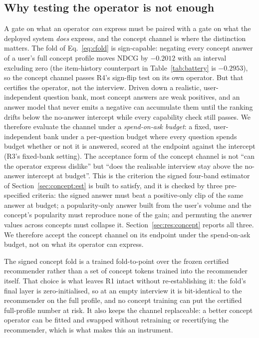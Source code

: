 \documentclass[manuscript,screen,review]{acmart}
\begin{document}
\subsection{Why testing the operator is not enough}\label{sec:concept:deploy}

A gate on what an operator \emph{can} express must be paired with a gate on what the deployed system \emph{does} express, and the concept channel is where the distinction matters. The fold of Eq.~\eqref{eq:cfold} is sign-capable: negating every concept answer of a user's full concept profile moves NDCG by $-0.2012$ with an interval excluding zero (the item-history counterpart in Table~\ref{tab:battery} is $-0.2953$), so the concept channel passes R4's sign-flip test on its own operator. But that certifies the operator, not the interview. Driven down a realistic, user-independent question bank, most concept answers are weak positives, and an answer model that never emits a negative can accumulate them until the ranking drifts below the no-answer intercept while every capability check still passes. We therefore evaluate the channel under a \emph{spend-on-ask budget}: a fixed, user-independent bank under a per-question budget where every question spends budget whether or not it is answered, scored at the endpoint against the intercept (R3's fixed-bank setting). The acceptance form of the concept channel is not ``can the operator express dislike'' but ``does the realisable interview stay above the no-answer intercept at budget''. This is the criterion the signed four-band estimator of Section~\ref{sec:concept:est} is built to satisfy, and it is checked by three pre-specified criteria: the signed answer must beat a positive-only clip of the same answer at budget; a popularity-only answer built from the user's volume and the concept's popularity must reproduce none of the gain; and permuting the answer values across concepts must collapse it. Section~\ref{sec:res:concept} reports all three. We therefore accept the concept channel on its endpoint under the spend-on-ask budget, not on what its operator can express.

The signed concept fold is a trained fold-to-point over the frozen certified recommender rather than a set of concept tokens trained into the recommender itself. That choice is what leaves R1 intact without re-establishing it: the fold's final layer is zero-initialised, so at an empty interview it is bit-identical to the recommender on the full profile, and no concept training can put the certified full-profile number at risk. It also keeps the channel replaceable: a better concept operator can be fitted and swapped without retraining or recertifying the recommender, which is what makes this an instrument.
\end{document}

